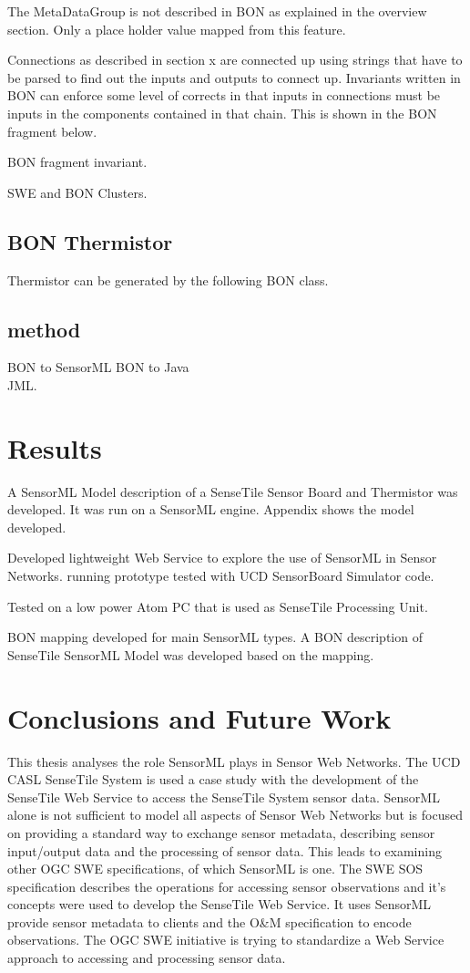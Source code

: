 \documentclass[]{final_report}
\begin{document}
The MetaDataGroup is not described in BON as explained in the overview section. Only a place holder value mapped from this feature.

Connections as described in section x are connected up using strings that have to be parsed to find out the inputs and outputs to connect up. Invariants written in BON can enforce some level of corrects in that inputs in connections must be inputs in the components contained in that chain. This is shown in the BON fragment below.

BON fragment invariant.

SWE and BON Clusters.
\section{BON Thermistor}
Thermistor can be generated by the following BON class.
\section{method}
BON to SensorML
BON to Java\\JML.

\chapter{Results}

A  SensorML Model description of a SenseTile Sensor Board and Thermistor was developed. It was
run on a SensorML engine. Appendix shows the model developed.

Developed lightweight Web Service to explore the use of SensorML in Sensor Networks.
running prototype tested with UCD SensorBoard Simulator code.

Tested on a low power Atom PC that is used as SenseTile Processing Unit.

BON mapping developed for main SensorML types. A BON description of SenseTile SensorML Model
was developed based on the mapping.

\chapter{ Conclusions and Future Work}
This thesis analyses the role SensorML plays in Sensor Web Networks. The UCD CASL SenseTile System is used a case study with the development of the SenseTile Web Service to access the SenseTile System sensor data. SensorML alone is not sufficient to model all aspects of Sensor Web Networks but is focused on providing a standard way to exchange sensor metadata, describing sensor input/output data and the processing of sensor data. This leads to examining other OGC SWE specifications, of which SensorML is one. The SWE SOS specification describes the operations for accessing sensor observations and it's concepts were used to develop the SenseTile Web Service. It uses SensorML provide sensor metadata to clients and the O\&M specification to encode observations. The OGC SWE initiative is trying to standardize a Web Service approach to accessing and processing sensor data.
\end{document}
